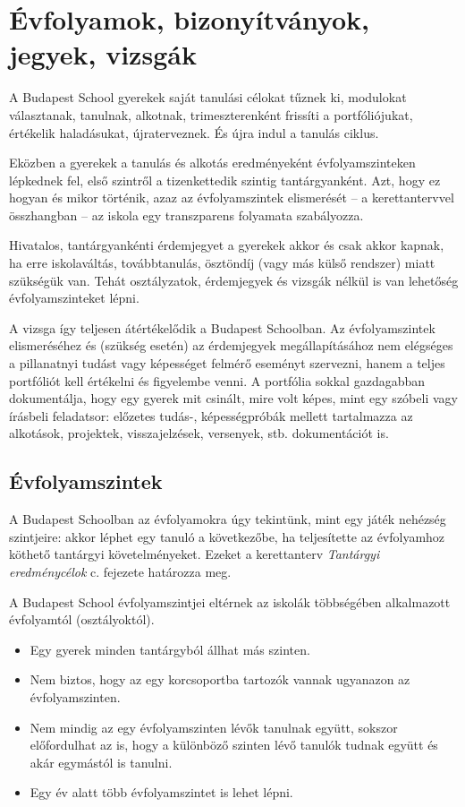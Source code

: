 \section{Évfolyamok, bizonyítványok, jegyek, vizsgák}
A Budapest School gyerekek saját tanulási célokat tűznek ki, modulokat
választanak, tanulnak, alkotnak, trimeszterenként frissíti a portfóliójukat,
értékelik haladásukat, újraterveznek. És újra indul a tanulás ciklus.

Eközben a gyerekek a tanulás és alkotás eredményeként évfolyamszinteken
lépkednek fel,
első szintről a tizenkettedik szintig tantárgyanként.
Azt, hogy ez hogyan és mikor történik, azaz az évfolyamszintek elismerését -- a
kerettantervvel összhangban -- az iskola egy transzparens folyamata
szabályozza.

Hivatalos, tantárgyankénti érdemjegyet a gyerekek akkor és csak akkor kapnak,
ha erre iskolaváltás, továbbtanulás, ösztöndíj	    (vagy más külső rendszer)
miatt szükségük van.
Tehát osztályzatok, érdemjegyek és vizsgák nélkül is van lehetőség
évfolyamszinteket lépni.

A vizsga így teljesen átértékelődik a Budapest Schoolban.
Az évfolyamszintek elismeréséhez és (szükség esetén) az érdemjegyek
megállapításához
nem elégséges a pillanatnyi tudást vagy képességet felmérő eseményt szervezni,
hanem
a teljes portfóliót kell értékelni és figyelembe venni.
A portfólia sokkal gazdagabban dokumentálja, hogy egy gyerek mit csinált, mire
volt képes, mint egy szóbeli vagy írásbeli feladatsor: előzetes tudás-,
képességpróbák
mellett tartalmazza az alkotások, projektek, visszajelzések, versenyek, stb.
dokumentációt is.

\subsection{Évfolyamszintek}
\label{sec:evfolyamok}

A Budapest Schoolban az évfolyamokra úgy tekintünk, mint egy játék nehézség
szintjeire: akkor léphet egy tanuló a következőbe, ha teljesítette az
évfolyamhoz köthető tantárgyi követelményeket. Ezeket a kerettanterv
\emph{Tantárgyi eredménycélok} c. fejezete határozza meg.

A Budapest School évfolyamszintjei eltérnek az iskolák többségében alkalmazott
évfolyamtól (osztályoktól).

\begin{itemize}
    \item Egy gyerek minden tantárgyból állhat más szinten.
    \item Nem biztos, hogy az egy korcsoportba tartozók vannak ugyanazon az
          évfolyamszinten.
    \item Nem mindig az egy évfolyamszinten lévők tanulnak együtt, sokszor
          előfordulhat az is, hogy a különböző szinten lévő tanulók tudnak
          együtt és akár egymástól is tanulni.
    \item Egy év alatt több évfolyamszintet is lehet lépni.
\end{itemize}

